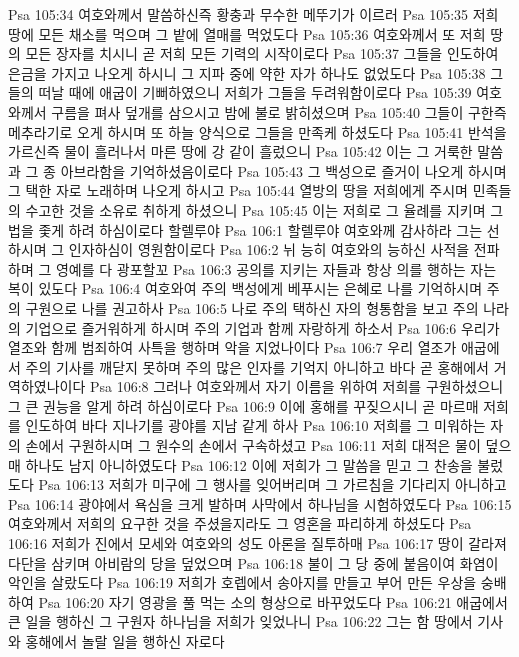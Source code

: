 Psa 105:34  여호와께서 말씀하신즉 황충과 무수한 메뚜기가 이르러
Psa 105:35  저희 땅에 모든 채소를 먹으며 그 밭에 열매를 먹었도다
Psa 105:36  여호와께서 또 저희 땅의 모든 장자를 치시니 곧 저희 모든 기력의 시작이로다
Psa 105:37  그들을 인도하여 은금을 가지고 나오게 하시니 그 지파 중에 약한 자가 하나도 없었도다
Psa 105:38  그들의 떠날 때에 애굽이 기뻐하였으니 저희가 그들을 두려워함이로다
Psa 105:39  여호와께서 구름을 펴사 덮개를 삼으시고 밤에 불로 밝히셨으며
Psa 105:40  그들이 구한즉 메추라기로 오게 하시며 또 하늘 양식으로 그들을 만족케 하셨도다
Psa 105:41  반석을 가르신즉 물이 흘러나서 마른 땅에 강 같이 흘렀으니
Psa 105:42  이는 그 거룩한 말씀과 그 종 아브라함을 기억하셨음이로다
Psa 105:43  그 백성으로 즐거이 나오게 하시며 그 택한 자로 노래하며 나오게 하시고
Psa 105:44  열방의 땅을 저희에게 주시며 민족들의 수고한 것을 소유로 취하게 하셨으니
Psa 105:45  이는 저희로 그 율례를 지키며 그 법을 좇게 하려 하심이로다 할렐루야
Psa 106:1  할렐루야 여호와께 감사하라 그는 선하시며 그 인자하심이 영원함이로다
Psa 106:2  뉘 능히 여호와의 능하신 사적을 전파하며 그 영예를 다 광포할꼬
Psa 106:3  공의를 지키는 자들과 항상 의를 행하는 자는 복이 있도다
Psa 106:4  여호와여 주의 백성에게 베푸시는 은혜로 나를 기억하시며 주의 구원으로 나를 권고하사
Psa 106:5  나로 주의 택하신 자의 형통함을 보고 주의 나라의 기업으로 즐거워하게 하시며 주의 기업과 함께 자랑하게 하소서
Psa 106:6  우리가 열조와 함께 범죄하여 사특을 행하며 악을 지었나이다
Psa 106:7  우리 열조가 애굽에서 주의 기사를 깨닫지 못하며 주의 많은 인자를 기억지 아니하고 바다 곧 홍해에서 거역하였나이다
Psa 106:8  그러나 여호와께서 자기 이름을 위하여 저희를 구원하셨으니 그 큰 권능을 알게 하려 하심이로다
Psa 106:9  이에 홍해를 꾸짖으시니 곧 마르매 저희를 인도하여 바다 지나기를 광야를 지남 같게 하사
Psa 106:10  저희를 그 미워하는 자의 손에서 구원하시며 그 원수의 손에서 구속하셨고
Psa 106:11  저희 대적은 물이 덮으매 하나도 남지 아니하였도다
Psa 106:12  이에 저희가 그 말씀을 믿고 그 찬송을 불렀도다
Psa 106:13  저희가 미구에 그 행사를 잊어버리며 그 가르침을 기다리지 아니하고
Psa 106:14  광야에서 욕심을 크게 발하며 사막에서 하나님을 시험하였도다
Psa 106:15  여호와께서 저희의 요구한 것을 주셨을지라도 그 영혼을 파리하게 하셨도다
Psa 106:16  저희가 진에서 모세와 여호와의 성도 아론을 질투하매
Psa 106:17  땅이 갈라져 다단을 삼키며 아비람의 당을 덮었으며
Psa 106:18  불이 그 당 중에 붙음이여 화염이 악인을 살랐도다
Psa 106:19  저희가 호렙에서 송아지를 만들고 부어 만든 우상을 숭배하여
Psa 106:20  자기 영광을 풀 먹는 소의 형상으로 바꾸었도다
Psa 106:21  애굽에서 큰 일을 행하신 그 구원자 하나님을 저희가 잊었나니
Psa 106:22  그는 함 땅에서 기사와 홍해에서 놀랄 일을 행하신 자로다
